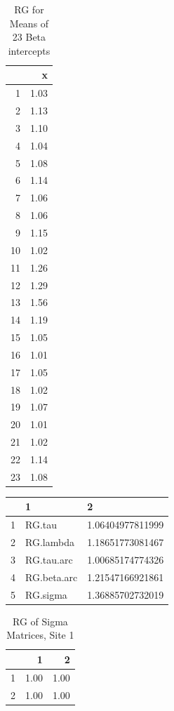 \documentclass[12pt]{article}
\begin{document}
\begin{table}[ht]\caption{RG for Means of 23 Beta intercepts}
\centering
\begin{tabular}{rr}
  \hline
 & x \\ 
  \hline
1 & 1.03 \\ 
  2 & 1.13 \\ 
  3 & 1.10 \\ 
  4 & 1.04 \\ 
  5 & 1.08 \\ 
  6 & 1.14 \\ 
  7 & 1.06 \\ 
  8 & 1.06 \\ 
  9 & 1.15 \\ 
  10 & 1.02 \\ 
  11 & 1.26 \\ 
  12 & 1.29 \\ 
  13 & 1.56 \\ 
  14 & 1.19 \\ 
  15 & 1.05 \\ 
  16 & 1.01 \\ 
  17 & 1.05 \\ 
  18 & 1.02 \\ 
  19 & 1.07 \\ 
  20 & 1.01 \\ 
  21 & 1.02 \\ 
  22 & 1.14 \\ 
  23 & 1.08 \\ 
   \hline
\end{tabular}
\end{table}

\begin{table}[ht]
\centering
\begin{tabular}{rll}
  \hline
 & 1 & 2 \\ 
  \hline
1 & RG.tau & 1.06404977811999 \\ 
  2 & RG.lambda & 1.18651773081467 \\ 
  3 & RG.tau.arc & 1.00685174774326 \\ 
  4 & RG.beta.arc & 1.21547166921861 \\ 
  5 & RG.sigma & 1.36885702732019 \\ 
   \hline
\end{tabular}
\end{table}



\begin{table}[ht]\caption{RG of Sigma Matrices, Site 1}
\centering
\begin{tabular}{rrr}
  \hline
 & 1 & 2 \\ 
  \hline
1 & 1.00 & 1.00 \\ 
  2 & 1.00 & 1.00 \\ 
   \hline
\end{tabular}
\end{table}
\end{document}

